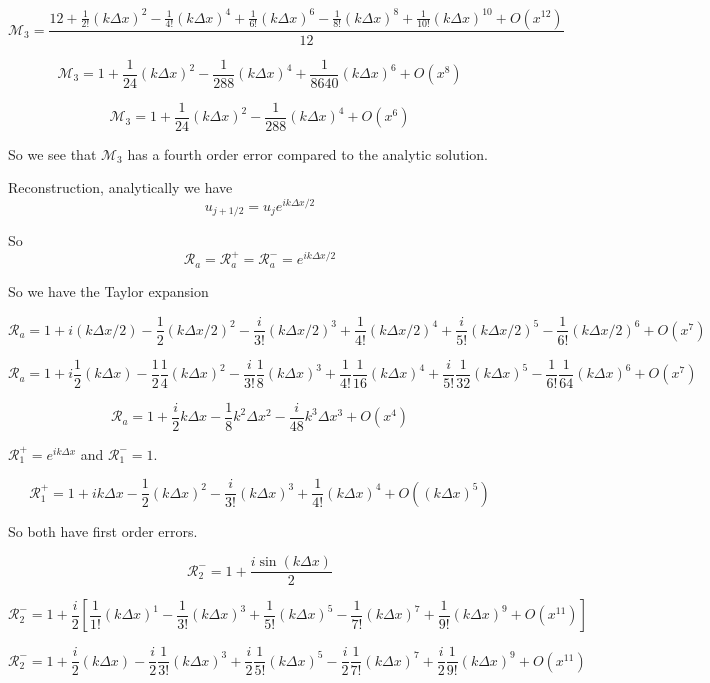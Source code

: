 \documentclass[12pt]{article}
\begin{document}
\[\mathcal{M}_3= \frac{12  + \frac{1}{2!} (k\Delta x)^2 - \frac{1}{4!} (k\Delta x)^4 + \frac{1}{6!} (k\Delta x)^6 - \frac{1}{8!} (k\Delta x)^8 + \frac{1}{10!} (k\Delta x)^{10} + O(x^{12})}{12}\]

\[\mathcal{M}_3= 1 + \frac{1}{24} (k\Delta x)^2 - \frac{1}{288} (k\Delta x)^4 + \frac{1}{8640} (k\Delta x)^6 + O(x^{8})\]

\[\mathcal{M}_3= 1 + \frac{1}{24} (k\Delta x)^2 - \frac{1}{288} (k\Delta x)^4 + O(x^{6})\]


So we see that $\mathcal{M}_3$ has a fourth order error compared to the analytic solution. 

Reconstruction, analytically we have
\[u_{j + 1/2} = u_j e^{ik\Delta x/2}\]

So
\[\mathcal{R}_a = \mathcal{R}^+_a = \mathcal{R}^-_a =e^{ik\Delta x/2} \]

So we have the Taylor expansion

\[\mathcal{R}_a = 1 + i (k\Delta x/2)  - \frac{1}{2} (k\Delta x/2)^2 - \frac{i}{3!} (k\Delta x/2)^3 + \frac{1}{4!} (k\Delta x/2)^4 + \frac{i}{5!} (k\Delta x/2)^5 - \frac{1}{6!} (k\Delta x/2)^6 + O(x^{7})\]

\[\mathcal{R}_a = 1 + i \frac{1}{2}(k\Delta x)  - \frac{1}{2}\frac{1}{4} (k\Delta x)^2 - \frac{i}{3!} \frac{1}{8}(k\Delta x)^3 + \frac{1}{4!} \frac{1}{16} (k\Delta x)^4 + \frac{i}{5!} \frac{1}{32} (k\Delta x)^5 - \frac{1}{6!}\frac{1}{64} (k\Delta x)^6 + O(x^{7})\]

\[\mathcal{R}_a = 1 + \frac{i}{2}k\Delta x   - \frac{1}{8}k^2\Delta x^2 - \frac{i}{48}k^3\Delta x^3 + O(x^{4})\]




$\mathcal{R}^+_1 =  e^{ik\Delta x}$ and $\mathcal{R}^-_1 =  1$. 

\[\mathcal{R}^+_1 = 1 + i k\Delta x  - \frac{1}{2} (k\Delta x)^2 - \frac{i}{3!} (k\Delta x)^3 + \frac{1}{4!} (k\Delta x)^4 +  O((k\Delta x)^5)\]

So both have first order errors. 


\[\mathcal{R}_2^- = 1  + \frac{i\sin\left(k\Delta x\right)}{2}\]

\[\mathcal{R}_2^- = 1  + \frac{i}{2} \left[\frac{1}{1!} (k \Delta x)^1 - \frac{1}{3!} (k \Delta x)^3 + \frac{1}{5!} (k \Delta x)^5 - \frac{1}{7!} (k \Delta x)^7 + \frac{1}{9!} (k \Delta x)^{9} + O(x^{11})\right]\]

\[\mathcal{R}_2^- = 1  + \frac{i}{2} (k \Delta x) - \frac{i}{2}\frac{1}{3!} (k \Delta x)^3 + \frac{i}{2}\frac{1}{5!} (k \Delta x)^5 - \frac{i}{2}\frac{1}{7!} (k \Delta x)^7 + \frac{i}{2}\frac{1}{9!} (k \Delta x)^{9} + O(x^{11})\]
\end{document}
